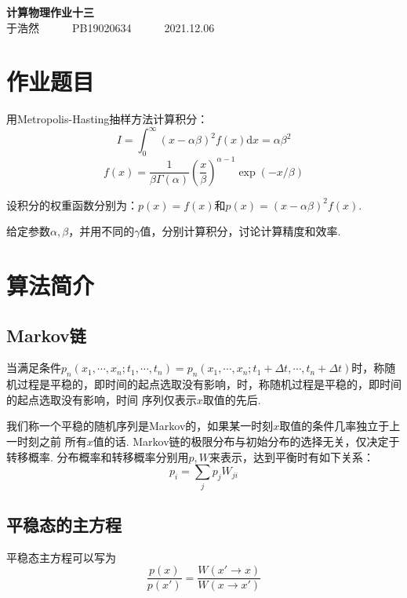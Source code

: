 \documentclass[12pt,a4paper,utf8]{ctexart}
\begin{document}
\begin{center}
    {\LARGE\textbf{计算物理作业十三}}\\
    \textrm{于浩然}~~~~~~\textrm{PB19020634}~~~~~~\textrm{2021.12.06}
\end{center}
\section{作业题目}

用Metropolis-Hasting抽样方法计算积分：
\begin{equation}
    I = \int _0 ^{\infty} (x-\alpha \beta)^2 f(x) \textrm{d}x = \alpha \beta ^2
\end{equation}
\begin{equation}
    f(x) = \frac{1}{\beta \Gamma(\alpha)} \left( \frac{x}{\beta}\right)^{\alpha
    - 1} \exp (-x/\beta)
\end{equation}

设积分的权重函数分别为：$p(x) = f(x)$和$p(x)=(x-\alpha \beta)^2 f(x)$. 

给定参数$\alpha, \beta$，并用不同的$\gamma$值，分别计算积分，讨论计算精度和效率.
\section{算法简介}
\subsection{Markov链}

当满足条件$p_n(x_1,\cdots,x_n;t_1,\cdots,t_n) = p_n(x_1,\cdots,x_n;t_1+\Delta
t,\cdots,t_n +\Delta
t)$时，称随机过程是平稳的，即时间的起点选取没有影响，时，称随机过程是平稳的，即时间的起点选取没有影响，时间
序列仅表示$x$取值的先后.

我们称一个平稳的随机序列是Markov的，如果某一时刻$x$取值的条件几率独立于上一时刻之前
所有$x$值的话. Markov链的极限分布与初始分布的选择无关，仅决定于转移概率.
分布概率和转移概率分别用$p,W$来表示，达到平衡时有如下关系：
\begin{equation}
    p_i = \sum_j p_jW_{ji}
\end{equation}

\subsection{平稳态的主方程}

平稳态主方程可以写为
\begin{equation}
    \frac{p(x)}{p(x')} = \frac{W(x'\rightarrow x)}{W(x\rightarrow x')}
\end{equation}
\end{document}
